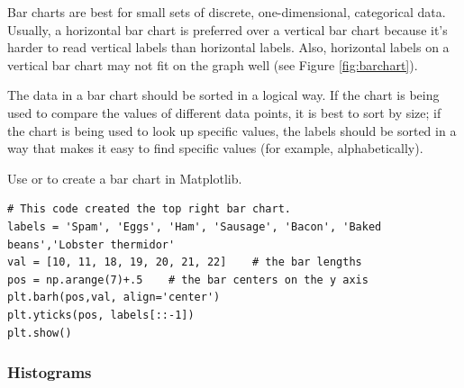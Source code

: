Bar charts are best for small sets of discrete, one-dimensional, categorical data.
Usually, a horizontal bar chart is preferred over a vertical bar chart because it's harder to read vertical labels than horizontal labels.
Also, horizontal labels on a vertical bar chart may not fit on the graph well (see Figure \ref{fig:barchart}).

The data in a bar chart should be sorted in a logical way.
If the chart is being used to compare the values of different data points, it is best to sort by size; if the chart is being used to look up specific values, the labels should be sorted in a way that makes it easy to find specific values (for example, alphabetically).

Use  or  to create a bar chart in Matplotlib.

\begin{lstlisting}
# This code created the top right bar chart.
labels = 'Spam', 'Eggs', 'Ham', 'Sausage', 'Bacon', 'Baked beans','Lobster thermidor'
val = [10, 11, 18, 19, 20, 21, 22]    # the bar lengths
pos = np.arange(7)+.5    # the bar centers on the y axis
plt.barh(pos,val, align='center')
plt.yticks(pos, labels[::-1])
plt.show()
\end{lstlisting}

\subsubsection*{Histograms} %

